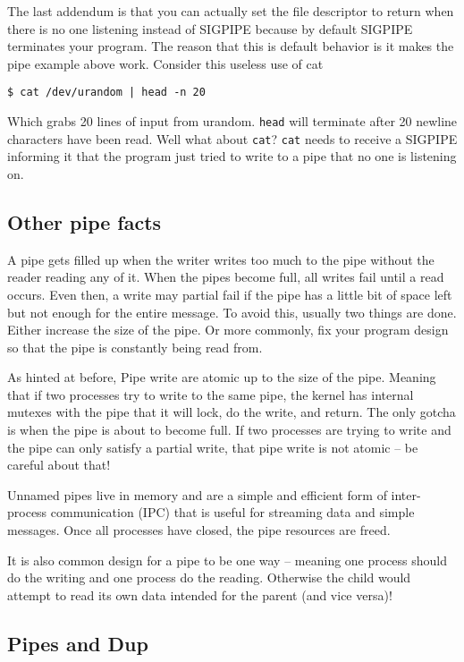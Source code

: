 The last addendum is that you can actually set the file descriptor to return when there is no one listening instead of SIGPIPE because by default SIGPIPE terminates your program.
The reason that this is default behavior is it makes the pipe example above work.
Consider this useless use of cat

\begin{verbatim}
$ cat /dev/urandom | head -n 20
\end{verbatim}
Which grabs 20 lines of input from urandom. \texttt{head} will terminate after 20 newline characters have been read. Well what about \texttt{cat}?
\texttt{cat} needs to receive a SIGPIPE informing it that the program just tried to write to a pipe that no one is listening on.

\subsection{Other pipe facts}

A pipe gets filled up when the writer writes too much to the pipe without the reader reading any of it. When the pipes become full, all writes fail until a read occurs. Even then, a write may partial fail if the pipe has a little bit of space left but not enough for the entire message. To avoid this, usually two things are done. Either increase the size of the pipe. Or more commonly, fix your program design so that the pipe is constantly being read from.

As hinted at before, Pipe write are atomic up to the size of the pipe. Meaning that if two processes try to write to the same pipe, the kernel has internal mutexes with the pipe that it will lock, do the write, and return. The only gotcha is when the pipe is about to become full. If two processes are trying to write and the pipe can only satisfy a partial write, that pipe write is not atomic -- be careful about that!

Unnamed pipes live in memory and are a simple and efficient form of inter-process communication (IPC) that is useful for streaming data and simple messages. Once all processes have closed, the pipe resources are freed.

It is also common design for a pipe to be one way -- meaning one process should do the writing and one process do the reading. Otherwise the child would attempt to read its own data intended for the parent (and vice versa)!

\subsection{Pipes and Dup}

